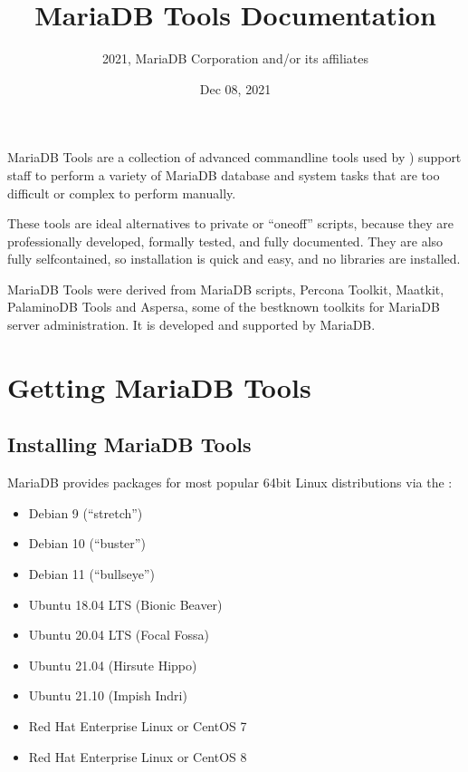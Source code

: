 \documentclass[letterpaper,10pt,english]{sphinxmanual}
\title{MariaDB Tools Documentation}
\date{Dec 08, 2021}
\author{2021, MariaDB Corporation and/or its affiliates}
\begin{document}
\pagestyle{empty}
\sphinxmaketitle
\pagestyle{plain}
\sphinxtableofcontents
\pagestyle{normal}
\label{\detokenize{index::doc}}


\sphinxAtStartPar
MariaDB Tools are a collection of advanced command\sphinxhyphen{}line tools
used by ) support staff
to perform a variety of MariaDB database and system tasks
that are too difficult or complex to perform manually.

\sphinxAtStartPar
These tools are ideal alternatives to private or “one\sphinxhyphen{}off” scripts,
because they are professionally developed, formally tested,
and fully documented.
They are also fully self\sphinxhyphen{}contained,
so installation is quick and easy,
and no libraries are installed.

\sphinxAtStartPar
MariaDB Tools were derived from MariaDB scripts, Percona Toolkit,
Maatkit, PalaminoDB Tools and Aspersa,
some of the best\sphinxhyphen{}known toolkits for MariaDB server administration.
It is developed and supported by MariaDB.


\part{Getting MariaDB Tools}
\label{\detokenize{index:getting-mariadb-tools}}

\chapter{Installing MariaDB Tools}
\label{\detokenize{installation:installing-mariadb-tools}}\label{\detokenize{installation:install}}\label{\detokenize{installation::doc}}
\sphinxAtStartPar
MariaDB provides packages for most popular 64\sphinxhyphen{}bit Linux distributions via the :
\begin{itemize}
\item {} 
\sphinxAtStartPar
Debian 9 (“stretch”)

\item {} 
\sphinxAtStartPar
Debian 10 (“buster”)

\item {} 
\sphinxAtStartPar
Debian 11 (“bullseye”)

\item {} 
\sphinxAtStartPar
Ubuntu 18.04 LTS (Bionic Beaver)

\item {} 
\sphinxAtStartPar
Ubuntu 20.04 LTS (Focal Fossa)

\item {} 
\sphinxAtStartPar
Ubuntu 21.04 (Hirsute Hippo)

\item {} 
\sphinxAtStartPar
Ubuntu 21.10 (Impish Indri)

\item {} 
\sphinxAtStartPar
Red Hat Enterprise Linux or CentOS 7

\item {} 
\sphinxAtStartPar
Red Hat Enterprise Linux or CentOS 8

\end{itemize}
\end{document}

